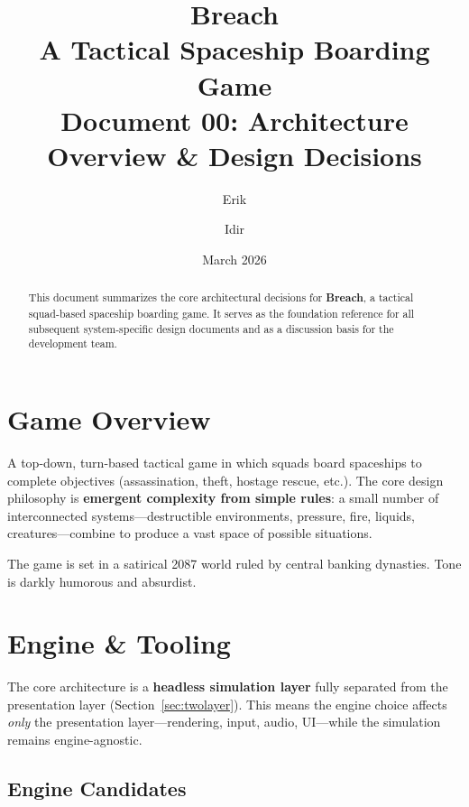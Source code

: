 \documentclass[11pt,a4paper]{article}
\title{%
    \vspace{-1cm}
    \textbf{Breach}\\[0.3cm]
    \Large A Tactical Spaceship Boarding Game\\[0.2cm]
    \large Document 00: Architecture Overview \& Design Decisions
}
\author{Erik \and Idir}
\date{March 2026}
\begin{document}
\maketitle

\begin{abstract}
This document summarizes the core architectural decisions for
\textbf{Breach}, a tactical squad-based spaceship boarding game.  It
serves as the foundation reference for all subsequent system-specific
design documents and as a discussion basis for the development team.
\end{abstract}

\tableofcontents
\newpage

\section{Game Overview}

A top-down, turn-based tactical game in which squads board spaceships to
complete objectives (assassination, theft, hostage rescue, etc.).  The
core design philosophy is \textbf{emergent complexity from simple rules}:
a small number of interconnected systems---destructible environments,
pressure, fire, liquids, creatures---combine to produce a vast space of
possible situations.

The game is set in a satirical 2087 world ruled by central banking
dynasties.  Tone is darkly humorous and absurdist.

\section{Engine \& Tooling}
\label{sec:engine}

The core architecture is a \textbf{headless simulation layer} fully
separated from the presentation layer (Section~\ref{sec:twolayer}).
This means the engine choice affects \emph{only} the presentation
layer---rendering, input, audio, UI---while the simulation remains
engine-agnostic.

\subsection{Engine Candidates}
\end{document}

